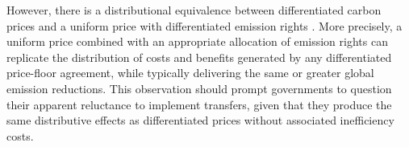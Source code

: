 \documentclass[12pt,english]{article}
\begin{document}
However, there is a distributional equivalence between differentiated carbon prices and a uniform price with differentiated emission rights \citep{fabre_global_2025}. %
More precisely, a uniform price combined with an appropriate allocation of emission rights can replicate the distribution of costs and benefits generated by any differentiated price-floor agreement, while typically delivering the same or greater global emission reductions. 
This observation should prompt governments to question their apparent reluctance to implement transfers, %
given that they produce the same distributive effects as differentiated prices without associated inefficiency costs. 


\end{document}
